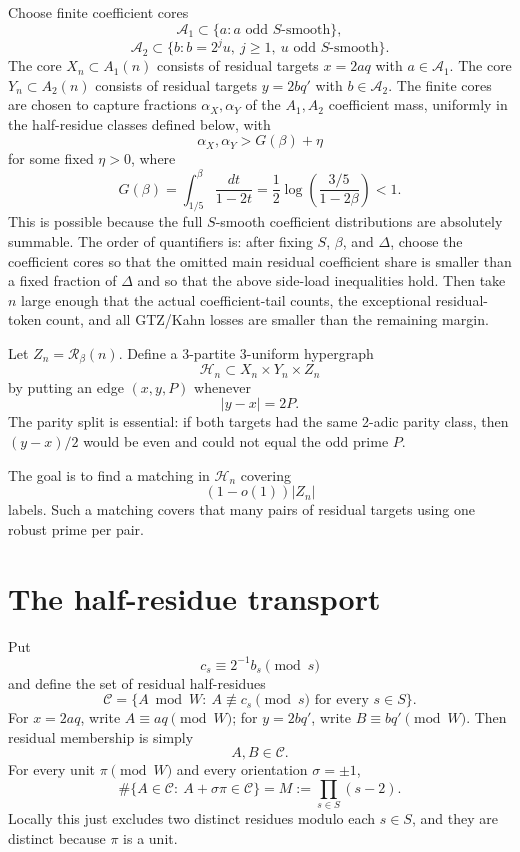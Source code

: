 \documentclass[11pt]{article}
\newcommand{\R}{\mathcal R}
\newcommand{\C}{\mathcal C}
\newcommand{\Hcal}{\mathcal H}
\begin{document}
Choose finite coefficient cores
\[
  \mathcal A_1\subset\{a:a\text{ odd }S\text{-smooth}\},
\]
\[
  \mathcal A_2\subset\{b:b=2^j u,\ j\ge1,\ u\text{ odd }S\text{-smooth}\}.
\]
The core \(X_n\subset A_1(n)\) consists of residual targets \(x=2aq\) with
\(a\in\mathcal A_1\).  The core \(Y_n\subset A_2(n)\) consists of residual
targets \(y=2bq'\) with \(b\in\mathcal A_2\).  The finite cores are chosen to
capture fractions \(\alpha_X,\alpha_Y\) of the \(A_1,A_2\) coefficient mass,
uniformly in the half-residue classes defined below, with
\[
  \alpha_X,\alpha_Y>G(\beta)+\eta
\]
for some fixed \(\eta>0\), where
\[
  G(\beta)=\int_{1/5}^{\beta}\frac{dt}{1-2t}
  =\frac12\log\left(\frac{3/5}{1-2\beta}\right)<1.
  \tag{3}
\]
This is possible because the full \(S\)-smooth coefficient distributions are
absolutely summable.  The order of quantifiers is: after fixing \(S\), \(\beta\),
and \(\Delta\), choose the coefficient cores so that the omitted main residual
coefficient share is smaller than a fixed fraction of \(\Delta\) and so that the
above side-load inequalities hold.  Then take \(n\) large enough that the actual
coefficient-tail counts, the exceptional residual-token count, and all GTZ/Kahn
losses are smaller than the remaining margin.

Let \(Z_n=\R_\beta(n)\).  Define a 3-partite 3-uniform hypergraph
\[
  \Hcal_n\subset X_n\times Y_n\times Z_n
\]
by putting an edge \((x,y,P)\) whenever
\[
  |y-x|=2P.
\]
The parity split is essential: if both targets had the same 2-adic parity
class, then \((y-x)/2\) would be even and could not equal the odd prime \(P\).

The goal is to find a matching in \(\Hcal_n\) covering
\[
  (1-o(1))|Z_n|
\]
labels.  Such a matching covers that many pairs of residual targets using one
robust prime per pair.

\section{The half-residue transport}

Put
\[
  c_s\equiv 2^{-1}b_s\pmod s
\]
and define the set of residual half-residues
\[
  \C=\{A\bmod W:\ A\not\equiv c_s\pmod s\text{ for every }s\in S\}.
\]
For \(x=2aq\), write \(A\equiv aq\pmod W\); for \(y=2bq'\), write
\(B\equiv bq'\pmod W\).  Then residual membership is simply
\[
  A,B\in\C.
\]
For every unit \(\pi\pmod W\) and every orientation \(\sigma=\pm1\),
\[
  \#\{A\in\C:\ A+\sigma\pi\in\C\}=M:=\prod_{s\in S}(s-2).
  \tag{4}
\]
Locally this just excludes two distinct residues modulo each \(s\in S\), and
they are distinct because \(\pi\) is a unit.
\end{document}
